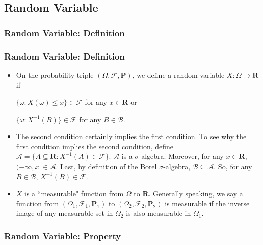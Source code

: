 \documentclass[handout]{beamer}
\newcommand{\BP}{\mathbf{P}}
\begin{document}
\subsection{Random Variable}

\subsubsection{Random Variable: Definition}
\frame
{
  \frametitle{Random Variable: Definition}

   \begin{itemize}

             \item<1->  On the probability triple $(\Omega, \mathcal{F},\BP)$, we define a random variable $X: \Omega \to \mathbf{R}$ if 
             
             $\{\omega: X(\omega) \leq x \} \in \mathcal{F}$ for any $x\in \mathbf{R}$  or 
             
             $\{\omega: X^{-1}(B) \} \in \mathcal{F}$ for any $B\in \mathcal{B}$.
             
\item<2->  The second condition certainly implies the first condition. To see why the first condition implies the second condition, define  $\mathcal{A}=\{A \subseteq \mathbf{R} : X^{-1}(A)\in \mathcal{F}\}$. $\mathcal{A}$ is a $\sigma$-algebra. Moreover, for any $x \in \mathbf{R}$, $(-\infty, x] \in \mathcal{A}$. Last, by definition of the Borel $\sigma$-algebra, $ \mathcal{B} \subseteq \mathcal{A}$. So, for any  $B\in \mathcal{B}$,   $X^{-1}(B)  \in \mathcal{F}$.      
                          
\item<3->  $X$ is a ``measurable" function from  $\Omega$ to $\mathbf{R}$. Generally speaking, we say a function from $(\Omega_1, \mathcal{F}_1,\BP_1)$ to  $(\Omega_2, \mathcal{F}_2,\BP_2)$ is measurable if the inverse image of any measurable set in $\Omega_2$ is also measurable in $\Omega_1$. 

\end{itemize}
}


\subsubsection{Random Variable: Property}
\end{document}
